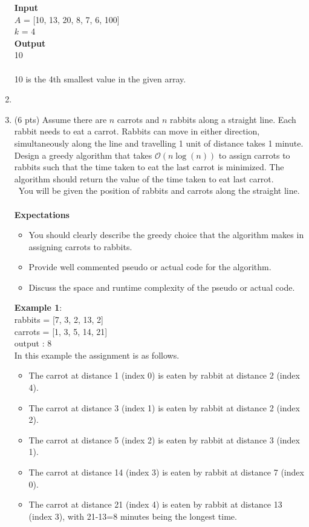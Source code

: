 \documentclass[12pt]{article}
\newcommand{\makenonemptybox}[2]{%
\item[]
\fbox{%
\parbox[c][#1][t]{\dimexpr\linewidth-2\fboxsep-2\fboxrule}{
  \hrule width \hsize height 0pt
  #2
 }%
}%
\par\vspace{\ht\strutbox}
}
\begin{document}
\begin{enumerate}
{    \textbf{Input}\\
        $A$ = [10, 13, 20, 8, 7, 6, 100] \\
        $k$ = 4\\
        \textbf{Output}\\
        10 \\ \\
        10 is the 4th smallest value in the given array.
    }
    \makenonemptybox{3in}{}
    \clearpage
    \item{(6 pts)
    Assume there are $n$ carrots and $n$ rabbits along a straight line.  
    Each rabbit needs to eat a carrot. Rabbits can move in either direction, simultaneously along the line and travelling 1 unit of distance takes 1 minute. Design a greedy algorithm that takes $\mathcal{O}(n\log(n))$ to assign carrots to rabbits such that the time taken to eat the last carrot is minimized. The algorithm should return the value of the time taken to eat last carrot.\\\
    You will be given the position of rabbits and carrots along the straight line.\\  \\
    \textbf{Expectations}
    \begin{itemize}
        \item  You should clearly describe the greedy choice that the algorithm makes in assigning carrots to rabbits.\\
        \item Provide well commented pseudo or actual code for the algorithm. \\
        \item Discuss the space and runtime complexity of the pseudo or actual code. 
    \end{itemize}
   
    
    \textbf{Example 1}: \\
    rabbits = [7, 3, 2, 13, 2] \\
    carrots = [1, 3, 5, 14, 21] \\
    output : 8 \\
    In this example the assignment is as follows.
    \begin{itemize}
        \item The carrot at distance 1 (index 0) is eaten by rabbit at distance 2 (index 4).
        \item  The carrot at distance 3 (index 1) is eaten by rabbit at distance 2 (index 2).
        \item The carrot at distance 5 (index 2) is eaten by rabbit at distance 3 (index 1).
        \item The carrot at distance 14 (index 3) is eaten by rabbit at distance 7 (index 0).
        \item The carrot at distance 21 (index 4) is eaten by rabbit at distance 13 (index 3), with 21-13=8 minutes being the longest time. 
        

\end{itemize}}
\end{enumerate}
\end{document}
